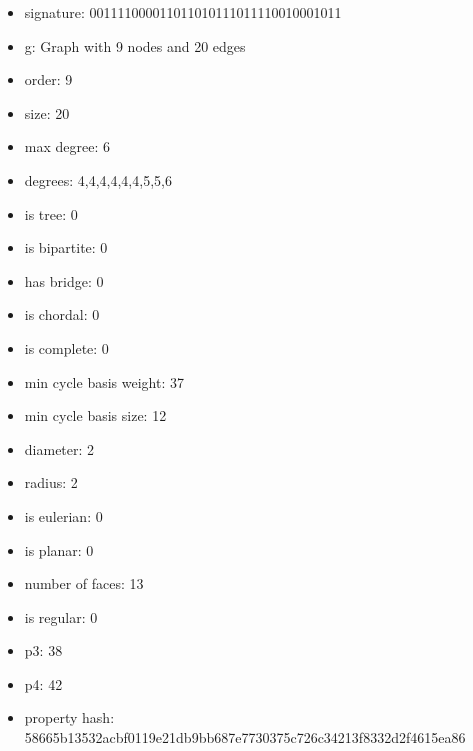 \newpage
\begin{figure}
\end{figure}
\begin{itemize}
\item signature: 001111000011011010111011110010001011
\item g: Graph with 9 nodes and 20 edges
\item order: 9
\item size: 20
\item max degree: 6
\item degrees: 4,4,4,4,4,4,5,5,6
\item is tree: 0
\item is bipartite: 0
\item has bridge: 0
\item is chordal: 0
\item is complete: 0
\item min cycle basis weight: 37
\item min cycle basis size: 12
\item diameter: 2
\item radius: 2
\item is eulerian: 0
\item is planar: 0
\item number of faces: 13
\item is regular: 0
\item p3: 38
\item p4: 42
\item property hash: 58665b13532acbf0119e21db9bb687e7730375c726c34213f8332d2f4615ea86
\end{itemize}
